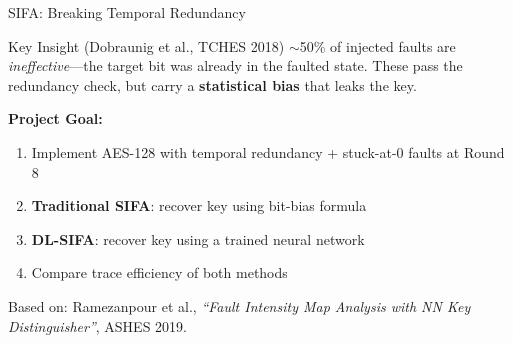 \documentclass[aspectratio=169]{beamer}
\begin{document}
\begin{frame}{SIFA: Breaking Temporal Redundancy}
\begin{block}{Key Insight (Dobraunig et al., TCHES 2018)}
$\sim$50\% of injected faults are \textit{ineffective}---the target bit was already in the faulted state. These pass the redundancy check, but carry a \textbf{statistical bias} that leaks the key.
\end{block}

\vspace{0.3cm}
\textbf{Project Goal:}
\begin{enumerate}
    \item Implement AES-128 with temporal redundancy + stuck-at-0 faults at Round 8
    \item \textbf{Traditional SIFA}: recover key using bit-bias formula
    \item \textbf{DL-SIFA}: recover key using a trained neural network
    \item Compare trace efficiency of both methods
\end{enumerate}

\vspace{0.2cm}
\small Based on: Ramezanpour et al., \textit{``Fault Intensity Map Analysis with NN Key Distinguisher''}, ASHES 2019.
\end{frame}
\end{document}
